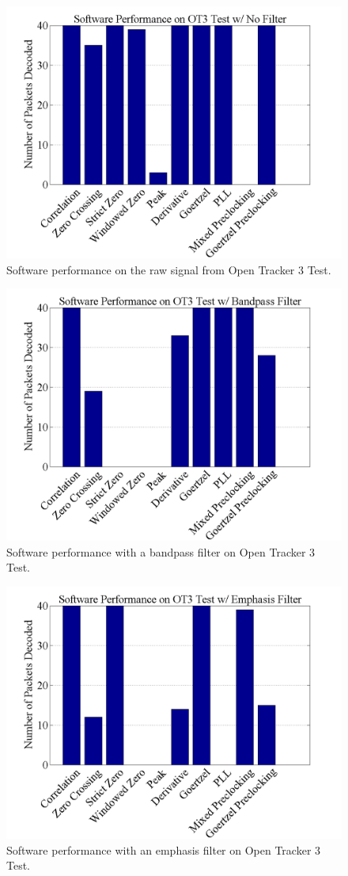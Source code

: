 \begin{figure}
  \centering
	\includegraphics[width=0.75\linewidth]{images/SoftwarePerformanceonOT3TestwNoFilter.png} 
	\caption{Software performance on the raw signal from Open Tracker 3 Test.}
   \label{OT3FiltNo}
\end{figure}
\begin{figure}
  \centering
	\includegraphics[width=0.75\linewidth]{images/SoftwarePerformanceonOT3TestwBandpassFilter.png} 
	\caption{Software performance with a bandpass filter on Open Tracker 3 Test.}
   \label{OT3Filt0}
\end{figure}
\begin{figure}
  \centering
	\includegraphics[width=0.75\linewidth]{images/SoftwarePerformanceonOT3TestwEmphasisFilter.png} 
	\caption{Software performance with an emphasis filter on Open Tracker 3 Test.}
   \label{OT3Filt6}
\end{figure}
